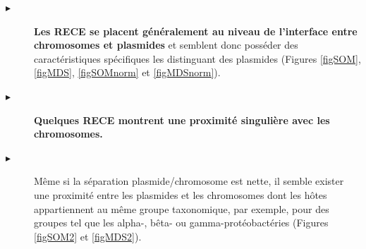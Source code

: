 \begin{description}
\item[$\blacktriangleright$] \textbf{\color{orange}Les RECE se placent généralement au niveau de l'interface entre chromosomes et plasmides} et semblent donc posséder des caractéristiques spécifiques les distinguant des plasmides (Figures \ref{figSOM}, \ref{figMDS}, \ref{figSOMnorm} et \ref{figMDSnorm}).
\item[$\blacktriangleright$] \textbf{\color{orange} Quelques RECE montrent une proximité singulière avec les chromosomes.}
\item[$\blacktriangleright$] Même si la séparation plasmide/chromosome est nette, il semble exister une proximité entre les plasmides et les chromosomes dont les hôtes appartiennent au même groupe taxonomique, par exemple, pour des groupes tel que les alpha-, bêta- ou gamma-protéobactéries (Figures \ref{figSOM2} et \ref{figMDS2}).


\end{description}

